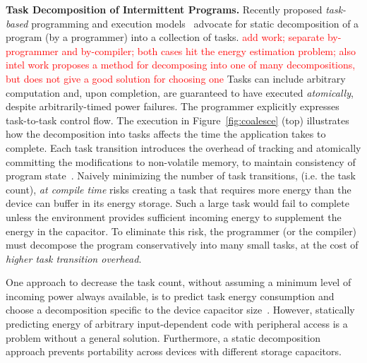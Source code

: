 
\textbf{Task Decomposition of Intermittent Programs.} Recently proposed {\em
task-based} programming and execution models~\citep{alpaca,chain} advocate for
static decomposition of a program (by a programmer) into a collection of tasks. \textcolor{red}{add \cite{intel} work; separate by-programmer and by-compiler; both cases hit the energy estimation problem; also intel work proposes a method for decomposing into one of many decompositions, but does not give a good solution for choosing one}
Tasks can include arbitrary computation and, upon completion, are guaranteed to
have executed {\em atomically}, despite arbitrarily-timed power failures.
The programmer explicitly expresses task-to-task control flow. The execution
in Figure~\ref{fig:coalesce} (top) illustrates how the decomposition into
tasks affects the time the application takes to complete. Each task transition introduces the overhead of tracking and atomically committing the modifications to non-volatile memory, to maintain consistency of program state~\citep{chain,alpaca}. Naively minimizing the number of task transitions, (i.e. the task count), \emph{at compile time} risks creating a task that requires more energy than the device can buffer in its energy storage. Such a large task would fail to complete unless the environment provides sufficient incoming energy to supplement the energy in the capacitor. To eliminate this risk, the programmer (or the compiler) must decompose the program conservatively into many small tasks, at the cost of \emph{higher task transition overhead}.

One approach to decrease the task count, without assuming a minimum level of
incoming power always available, is to predict task energy consumption and
choose a decomposition specific to the device capacitor size~\cite{cleancut}. However, statically predicting energy of arbitrary input-dependent code with peripheral access is a problem without a general solution. Furthermore, a static decomposition approach prevents portability across devices with different storage capacitors.

